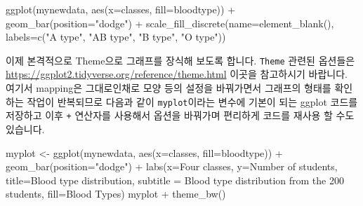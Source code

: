 \documentclass[
]{book}
\newenvironment{Shaded}{\begin{snugshade}}{\end{snugshade}}
\newcommand{\AttributeTok}[1]{\textcolor[rgb]{0.77,0.63,0.00}{#1}}
\newcommand{\FunctionTok}[1]{\textcolor[rgb]{0.00,0.00,0.00}{#1}}
\newcommand{\NormalTok}[1]{#1}
\newcommand{\OtherTok}[1]{\textcolor[rgb]{0.56,0.35,0.01}{#1}}
\newcommand{\SpecialCharTok}[1]{\textcolor[rgb]{0.00,0.00,0.00}{#1}}
\newcommand{\StringTok}[1]{\textcolor[rgb]{0.31,0.60,0.02}{#1}}
\begin{document}
\begin{Shaded}
\begin{Highlighting}[]
\FunctionTok{ggplot}\NormalTok{(mynewdata, }\FunctionTok{aes}\NormalTok{(}\AttributeTok{x=}\NormalTok{classes, }\AttributeTok{fill=}\NormalTok{bloodtype)) }\SpecialCharTok{+}
  \FunctionTok{geom\_bar}\NormalTok{(}\AttributeTok{position=}\StringTok{"dodge"}\NormalTok{) }\SpecialCharTok{+}
  \FunctionTok{scale\_fill\_discrete}\NormalTok{(}\AttributeTok{name=}\FunctionTok{element\_blank}\NormalTok{(), }\AttributeTok{labels=}\FunctionTok{c}\NormalTok{(}\StringTok{"A type"}\NormalTok{, }\StringTok{"AB type"}\NormalTok{, }\StringTok{"B type"}\NormalTok{, }\StringTok{"O type"}\NormalTok{))}
\end{Highlighting}
\end{Shaded}

이제 본격적으로 Theme으로 그래프를 장식해 보도록 합니다. \texttt{Theme} 관련된 옵션들은 \url{https://ggplot2.tidyverse.org/reference/theme.html} 이곳을 참고하시기 바랍니다. 여기서 mapping은 그대로인채로 모양 등의 설정을 바꿔가면서 그래프의 형태를 확인하는 작업이 반복되므로 다음과 같이 \texttt{myplot}이라는 변수에 기본이 되는 ggplot 코드를 저장하고 이후 \texttt{+} 연산자를 사용해서 옵션을 바꿔가며 편리하게 코드를 재사용 할 수도 있습니다.

\begin{Shaded}
\begin{Highlighting}[]
\NormalTok{myplot }\OtherTok{\textless{}{-}} \FunctionTok{ggplot}\NormalTok{(mynewdata, }\FunctionTok{aes}\NormalTok{(}\AttributeTok{x=}\NormalTok{classes, }\AttributeTok{fill=}\NormalTok{bloodtype)) }\SpecialCharTok{+}
  \FunctionTok{geom\_bar}\NormalTok{(}\AttributeTok{position=}\StringTok{"dodge"}\NormalTok{) }\SpecialCharTok{+}
  \FunctionTok{labs}\NormalTok{(}\AttributeTok{x=}\StringTok{\textquotesingle{}Four classes\textquotesingle{}}\NormalTok{,}
       \AttributeTok{y=}\StringTok{\textquotesingle{}Number of students\textquotesingle{}}\NormalTok{,}
       \AttributeTok{title=}\StringTok{\textquotesingle{}Blood type distribution\textquotesingle{}}\NormalTok{,}
       \AttributeTok{subtitle =} \StringTok{\textquotesingle{}Blood type distribution from the 200 students\textquotesingle{}}\NormalTok{,}
       \AttributeTok{fill=}\StringTok{\textquotesingle{}Blood Types\textquotesingle{}}\NormalTok{) }
\NormalTok{myplot }\SpecialCharTok{+} \FunctionTok{theme\_bw}\NormalTok{()}
\end{Highlighting}
\end{Shaded}
\end{document}

